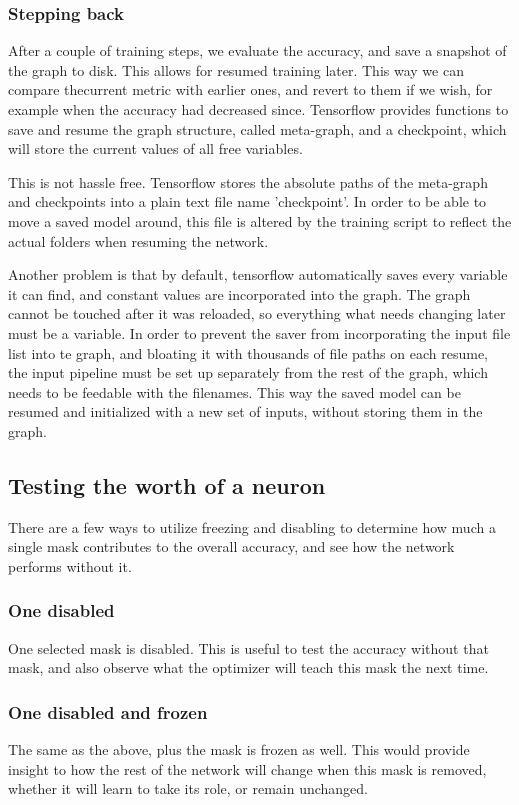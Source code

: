 \documentclass[12pt]{report}
\begin{document}
\subsubsection{Stepping back}
After a couple of training steps, we evaluate the accuracy, and save a snapshot of the graph to disk. This allows for resumed training later. This way we can compare thecurrent metric with earlier ones, and revert to them if we wish, for example when the accuracy had decreased since. Tensorflow provides functions to save and resume the graph structure, called meta-graph, and a checkpoint, which will store the current values of all free variables.\par
This is not hassle free. Tensorflow stores the absolute paths of the meta-graph and checkpoints into a plain text file name 'checkpoint'. In order to be able to move a saved model around, this file is altered by the training script to reflect the actual folders when resuming the network.\par
Another problem is that by default, tensorflow automatically saves every variable it can find, and constant values are incorporated into the graph. The graph cannot be touched after it was reloaded, so everything what needs changing later must be a variable. In order to prevent the saver from incorporating the input file list into te graph, and bloating it with thousands of file paths on each resume, the input pipeline must be set up separately from the rest of the graph, which needs to be feedable with the filenames. This way the saved model can be resumed and initialized with a new set of inputs, without storing them in the graph.
\subsection{Testing the worth of a neuron}
There are a few ways to utilize freezing and disabling to determine how much a single mask contributes to the overall accuracy, and see how the network performs without it.
\subsubsection{One disabled}One selected mask is disabled. This is useful to test the accuracy without that mask, and also observe what the optimizer will teach this mask the next time.
\subsubsection{One disabled and frozen}The same as the above, plus the mask is frozen as well. This would provide insight to how the rest of the network will change when this mask is removed, whether it will learn to take its role, or remain unchanged.
\end{document}
